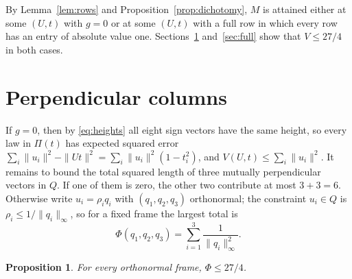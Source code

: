 \documentclass[11pt]{amsart}
\newtheorem{prop}[thm]{Proposition}
\theoremstyle{remark}
\numberwithin{equation}{section}
\begin{document}
By Lemma~\ref{lem:rows} and Proposition~\ref{prop:dichotomy}, $M$ is attained either at some $(U,t)$ with $g=0$ or at some $(U,t)$ with a full row in which every row has an entry of absolute value one. Sections~\ref{sec:perp} and~\ref{sec:full} show that $V\le27/4$ in both cases.

\section{Perpendicular columns}\label{sec:perp}

If $g=0$, then by \eqref{eq:heights} all eight sign vectors have the same height, so every law in $\Pi(t)$ has expected squared error $\sum_i\|u_i\|^2-\|Ut\|^2=\sum_i\|u_i\|^2(1-t_i^2)$, and $V(U,t)\le\sum_i\|u_i\|^2$. It remains to bound the total squared length of three mutually perpendicular vectors in $Q$. If one of them is zero, the other two contribute at most $3+3=6$. Otherwise write $u_i=\rho_iq_i$ with $(q_1,q_2,q_3)$ orthonormal; the constraint $u_i\in Q$ is $\rho_i\le1/\|q_i\|_\infty$, so for a fixed frame the largest total is
\[
\Phi(q_1,q_2,q_3)=\sum_{i=1}^3\frac1{\|q_i\|_\infty^2}.
\]

\begin{prop}\label{prop:frames}
For every orthonormal frame, $\Phi\le27/4$.
\end{prop}
\end{document}
